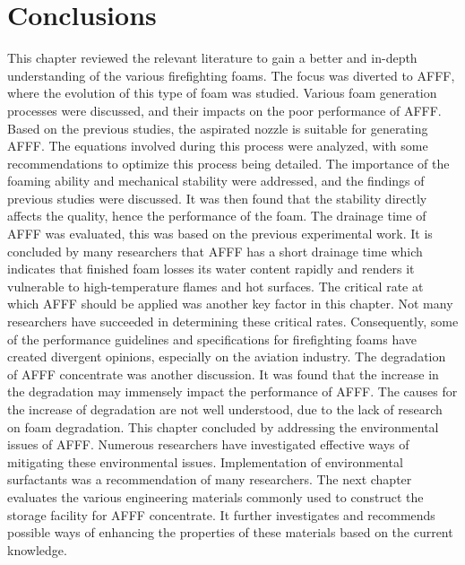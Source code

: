 \section{Conclusions}
This chapter reviewed the relevant literature to gain a better and in-depth understanding of the various firefighting foams. The focus was diverted to AFFF, where the evolution of this type of foam was studied. Various foam generation processes were discussed, and their impacts on the poor performance of AFFF. Based on the previous studies, the aspirated nozzle is suitable for generating AFFF. The equations involved during this process were analyzed, with some recommendations to optimize this process being detailed. The importance of the foaming ability and mechanical stability were addressed, and the findings of previous studies were discussed. It was then found that the stability directly affects the quality, hence the performance of the foam.
The drainage time of AFFF was evaluated, this was based on the previous experimental work. It is concluded by many researchers that AFFF has a short drainage time which indicates that finished foam losses its water content rapidly and renders it vulnerable to high-temperature flames and hot surfaces.
The critical rate at which AFFF should be applied was another key factor in this chapter. Not many researchers have succeeded in determining these critical rates. Consequently, some of the performance guidelines and specifications for firefighting foams have created divergent opinions, especially on the aviation industry. The degradation of AFFF concentrate was another discussion. It was found that the increase in the degradation may immensely impact the performance of AFFF. The causes for the increase of degradation are not well understood, due to the lack of research on foam degradation. This chapter concluded by addressing the environmental issues of AFFF. Numerous researchers have investigated effective ways of mitigating these environmental issues. Implementation of environmental surfactants was a recommendation of many researchers.
The next chapter evaluates the various engineering materials commonly used to construct the storage facility for AFFF concentrate. It further investigates and recommends possible ways of enhancing the properties of these materials based on the current knowledge.